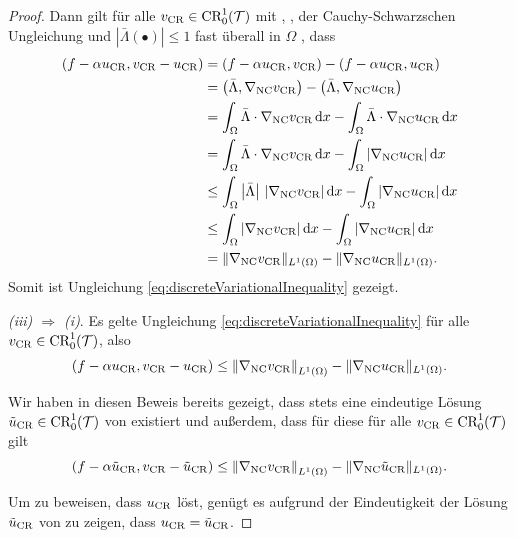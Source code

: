 \begin{proof}
  Dann gilt für alle $v_\textup{CR}\in\textup{CR}^1_0(\mathcal{T})$ mit
  ,
  , der Cauchy-Schwarzschen
  Ungleichung und $\left|\bar\Lambda(\bullet)\right|\leq 1$ fast überall in
  $\Omega$ , dass
  \begin{align*}
    (f-\alpha u_\textup{CR},v_\textup{CR}-u_\textup{CR}) 
    &= 
    (f-\alpha u_\textup{CR},v_\textup{CR}) 
    - (f-\alpha u_\textup{CR},u_\textup{CR}) \\
    &=
    \left(\bar\Lambda,\nabla_\textup{NC}v_\textup{CR}\right)
    - \left(\bar\Lambda,\nabla_\textup{NC}u_\textup{CR}\right)\\
    &=
    \int_\Omega\bar\Lambda\cdot\nabla_\textup{NC}v_\textup{CR}\,\mathrm{d}x
    - \int_\Omega\bar\Lambda\cdot\nabla_\textup{NC}u_\textup{CR}\,\mathrm{d}x\\
    &=
    \int_\Omega\bar\Lambda\cdot\nabla_\textup{NC}v_\textup{CR}\,\mathrm{d}x
    - \int_\Omega|\nabla_\textup{NC}u_\textup{CR}|\,\mathrm{d}x\\
    &\leq 
    \int_\Omega\left|\bar\Lambda\right|\,|\nabla_\textup{NC}v_\textup{CR}|\,\mathrm{d}x
    - \int_\Omega|\nabla_\textup{NC}u_\textup{CR}|\,\mathrm{d}x\\
    &\leq 
    \int_\Omega|\nabla_\textup{NC}v_\textup{CR}|\,\mathrm{d}x
    - \int_\Omega|\nabla_\textup{NC}u_\textup{CR}|\,\mathrm{d}x\\
    &=
    \Vert\nabla_\textup{NC}v_\textup{CR}\Vert_{L^1(\Omega)}
    -\Vert\nabla_\textup{NC}u_\textup{CR}\Vert_{L^1(\Omega)}.
  \end{align*}
  Somit ist Ungleichung \eqref{eq:discreteVariationalInequality} gezeigt.

  \textit{(iii) $\Rightarrow$ (i)}.
  Es gelte Ungleichung \eqref{eq:discreteVariationalInequality} für alle
  $v_\textup{CR}\in\textup{CR}^1_0(\mathcal{T})$, also
  \begin{align*}
    \left(f-\alpha u_\textup{CR},v_\textup{CR}-u_\textup{CR}\right) 
    \leq
    \left\Vert\nabla_\textup{NC}v_\textup{CR}\right\Vert_{L^1(\Omega)}
    -\Vert\nabla_\textup{NC}u_\textup{CR}\Vert_{L^1(\Omega)}.
  \end{align*}


  Wir haben in diesen Beweis bereits gezeigt, dass stets eine eindeutige Lösung
  $\tilde{u}_{\textup{CR}}\in\textup{CR}^1_0(\mathcal{T})$ von  existiert
  und außerdem, dass für diese
  für alle $v_\textup{CR}\in\textup{CR}^1_0(\mathcal{T})$ gilt
  \begin{align*}
    \left(f-\alpha\tilde{u}_{\textup{CR}},v_\textup{CR}-\tilde{u}_{\textup{CR}}\right) 
    \leq
    \left\Vert\nabla_\textup{NC}v_\textup{CR}\right\Vert_{L^1(\Omega)}
    -\Vert\nabla_\textup{NC}\tilde{u}_{\textup{CR}}\Vert_{L^1(\Omega)}.
  \end{align*}

  Um zu beweisen, dass $u_\textup{CR}$  löst, genügt es
  aufgrund der Eindeutigkeit der Lösung $\tilde{u}_{\textup{CR}}$ von
   zu zeigen, dass $u_\textup{CR}=\tilde{u}_{\textup{CR}}$.


\end{proof}
